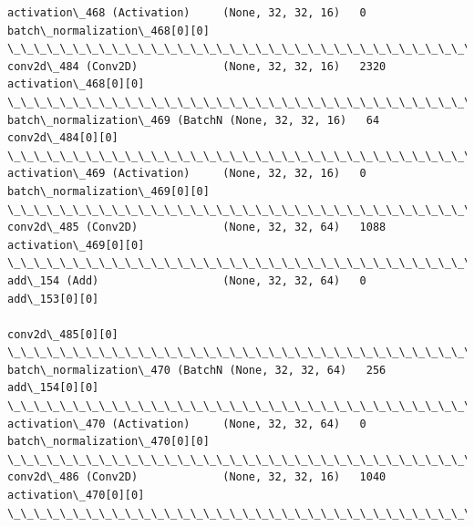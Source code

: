 \documentclass[11pt]{article}
\begin{document}
\begin{Verbatim}[commandchars=\\\{\}]
activation\_468 (Activation)     (None, 32, 32, 16)   0           batch\_normalization\_468[0][0]    
\_\_\_\_\_\_\_\_\_\_\_\_\_\_\_\_\_\_\_\_\_\_\_\_\_\_\_\_\_\_\_\_\_\_\_\_\_\_\_\_\_\_\_\_\_\_\_\_\_\_\_\_\_\_\_\_\_\_\_\_\_\_\_\_\_\_\_\_\_\_\_\_\_\_\_\_\_\_\_\_\_\_\_\_\_\_\_\_\_\_\_\_\_\_\_\_\_\_
conv2d\_484 (Conv2D)             (None, 32, 32, 16)   2320        activation\_468[0][0]             
\_\_\_\_\_\_\_\_\_\_\_\_\_\_\_\_\_\_\_\_\_\_\_\_\_\_\_\_\_\_\_\_\_\_\_\_\_\_\_\_\_\_\_\_\_\_\_\_\_\_\_\_\_\_\_\_\_\_\_\_\_\_\_\_\_\_\_\_\_\_\_\_\_\_\_\_\_\_\_\_\_\_\_\_\_\_\_\_\_\_\_\_\_\_\_\_\_\_
batch\_normalization\_469 (BatchN (None, 32, 32, 16)   64          conv2d\_484[0][0]                 
\_\_\_\_\_\_\_\_\_\_\_\_\_\_\_\_\_\_\_\_\_\_\_\_\_\_\_\_\_\_\_\_\_\_\_\_\_\_\_\_\_\_\_\_\_\_\_\_\_\_\_\_\_\_\_\_\_\_\_\_\_\_\_\_\_\_\_\_\_\_\_\_\_\_\_\_\_\_\_\_\_\_\_\_\_\_\_\_\_\_\_\_\_\_\_\_\_\_
activation\_469 (Activation)     (None, 32, 32, 16)   0           batch\_normalization\_469[0][0]    
\_\_\_\_\_\_\_\_\_\_\_\_\_\_\_\_\_\_\_\_\_\_\_\_\_\_\_\_\_\_\_\_\_\_\_\_\_\_\_\_\_\_\_\_\_\_\_\_\_\_\_\_\_\_\_\_\_\_\_\_\_\_\_\_\_\_\_\_\_\_\_\_\_\_\_\_\_\_\_\_\_\_\_\_\_\_\_\_\_\_\_\_\_\_\_\_\_\_
conv2d\_485 (Conv2D)             (None, 32, 32, 64)   1088        activation\_469[0][0]             
\_\_\_\_\_\_\_\_\_\_\_\_\_\_\_\_\_\_\_\_\_\_\_\_\_\_\_\_\_\_\_\_\_\_\_\_\_\_\_\_\_\_\_\_\_\_\_\_\_\_\_\_\_\_\_\_\_\_\_\_\_\_\_\_\_\_\_\_\_\_\_\_\_\_\_\_\_\_\_\_\_\_\_\_\_\_\_\_\_\_\_\_\_\_\_\_\_\_
add\_154 (Add)                   (None, 32, 32, 64)   0           add\_153[0][0]                    
                                                                 conv2d\_485[0][0]                 
\_\_\_\_\_\_\_\_\_\_\_\_\_\_\_\_\_\_\_\_\_\_\_\_\_\_\_\_\_\_\_\_\_\_\_\_\_\_\_\_\_\_\_\_\_\_\_\_\_\_\_\_\_\_\_\_\_\_\_\_\_\_\_\_\_\_\_\_\_\_\_\_\_\_\_\_\_\_\_\_\_\_\_\_\_\_\_\_\_\_\_\_\_\_\_\_\_\_
batch\_normalization\_470 (BatchN (None, 32, 32, 64)   256         add\_154[0][0]                    
\_\_\_\_\_\_\_\_\_\_\_\_\_\_\_\_\_\_\_\_\_\_\_\_\_\_\_\_\_\_\_\_\_\_\_\_\_\_\_\_\_\_\_\_\_\_\_\_\_\_\_\_\_\_\_\_\_\_\_\_\_\_\_\_\_\_\_\_\_\_\_\_\_\_\_\_\_\_\_\_\_\_\_\_\_\_\_\_\_\_\_\_\_\_\_\_\_\_
activation\_470 (Activation)     (None, 32, 32, 64)   0           batch\_normalization\_470[0][0]    
\_\_\_\_\_\_\_\_\_\_\_\_\_\_\_\_\_\_\_\_\_\_\_\_\_\_\_\_\_\_\_\_\_\_\_\_\_\_\_\_\_\_\_\_\_\_\_\_\_\_\_\_\_\_\_\_\_\_\_\_\_\_\_\_\_\_\_\_\_\_\_\_\_\_\_\_\_\_\_\_\_\_\_\_\_\_\_\_\_\_\_\_\_\_\_\_\_\_
conv2d\_486 (Conv2D)             (None, 32, 32, 16)   1040        activation\_470[0][0]             
\_\_\_\_\_\_\_\_\_\_\_\_\_\_\_\_\_\_\_\_\_\_\_\_\_\_\_\_\_\_\_\_\_\_\_\_\_\_\_\_\_\_\_\_\_\_\_\_\_\_\_\_\_\_\_\_\_\_\_\_\_\_\_\_\_\_\_\_\_\_\_\_\_\_\_\_\_\_\_\_\_\_\_\_\_\_\_\_\_\_\_\_\_\_\_\_\_\_

\end{Verbatim}
\end{document}
